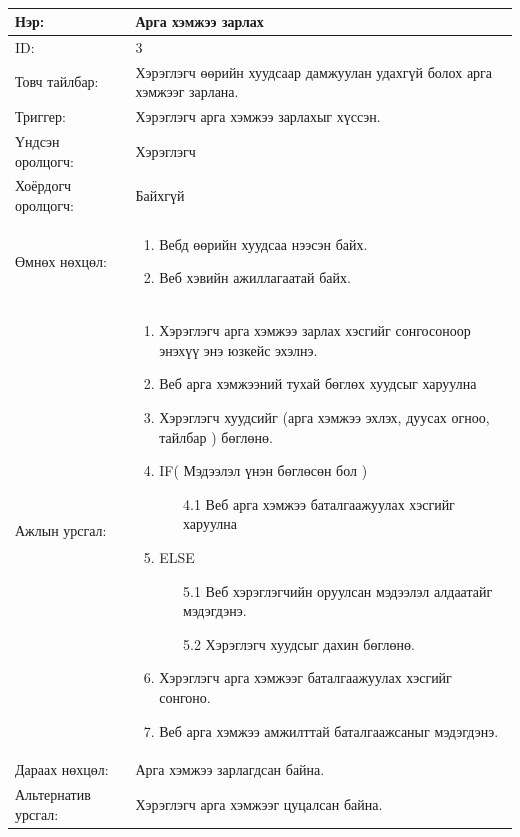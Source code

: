 \begin{center}
	\begin{table}[!htbp]
		\caption{}
		\begin{tabular}{|p{4cm}|p{11cm}|}
			\hline
			Нэр: & Арга хэмжээ зарлах \\
			\hline
			ID: & 3 \\
			\hline
			Товч тайлбар: & Хэрэглэгч өөрийн хуудсаар дамжуулан удахгүй болох арга хэмжээг зарлана.  \\
			\hline
			Триггер: & Хэрэглэгч арга хэмжээ зарлахыг хүссэн. \\
			\hline
			Үндсэн оролцогч: & Хэрэглэгч \\
			\hline
			Хоёрдогч оролцогч: & Байхгүй  \\
			\hline
			Өмнөх нөхцөл: &  \begin{enumerate}
				\item Вебд  өөрийн хуудсаа нээсэн байх.
				\item Веб хэвийн ажиллагаатай байх.
			\end{enumerate}
			\\			\hline
			Ажлын урсгал: & \begin{enumerate}
								\item Хэрэглэгч арга хэмжээ зарлах хэсгийг сонгосоноор энэхүү энэ юзкейс эхэлнэ.
								\item Веб арга хэмжээний тухай бөглөх хуудсыг харуулна
								\item Хэрэглэгч хуудсийг (арга хэмжээ эхлэх, дуусах огноо, тайлбар ) бөглөнө.
								\item IF( Мэдээлэл үнэн бөглөсөн бол )
									\begin{enumerate}
										\item[4.1] Веб арга хэмжээ баталгаажуулах хэсгийг харуулна
									\end{enumerate}
								\item ELSE 
									\begin{enumerate}
										\item[5.1] Веб хэрэглэгчийн оруулсан мэдээлэл алдаатайг мэдэгдэнэ.
										\item[5.2] Хэрэглэгч хуудсыг дахин бөглөнө.
									\end{enumerate}
								\item Хэрэглэгч арга хэмжээг баталгаажуулах хэсгийг сонгоно.
								\item Веб арга хэмжээ амжилттай баталгаажсаныг мэдэгдэнэ.
							\end{enumerate}
\\						\hline
			Дараах нөхцөл: & Арга хэмжээ зарлагдсан байна. \\
			\hline
			Альтернатив урсгал: & Хэрэглэгч арга хэмжээг цуцалсан байна. \\
			\hline
		\end{tabular}
	\end{table}
\end{center}


